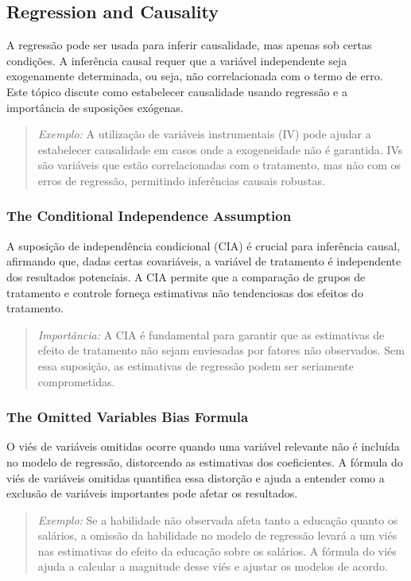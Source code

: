 \documentclass[a4paper,12pt]{article}[abntex2]
\begin{document}
\subsection{Regression and Causality}
A regressão pode ser usada para inferir causalidade, mas apenas sob certas condições. A inferência causal requer que a variável independente seja exogenamente determinada, ou seja, não correlacionada com o termo de erro. Este tópico discute como estabelecer causalidade usando regressão e a importância de suposições exógenas.

\begin{quote}
\textit{Exemplo:} A utilização de variáveis instrumentais (IV) pode ajudar a estabelecer causalidade em casos onde a exogeneidade não é garantida. IVs são variáveis que estão correlacionadas com o tratamento, mas não com os erros de regressão, permitindo inferências causais robustas.
\end{quote}

\subsubsection{The Conditional Independence Assumption}
A suposição de independência condicional (CIA) é crucial para inferência causal, afirmando que, dadas certas covariáveis, a variável de tratamento é independente dos resultados potenciais. A CIA permite que a comparação de grupos de tratamento e controle forneça estimativas não tendenciosas dos efeitos do tratamento.

\begin{quote}
\textit{Importância:} A CIA é fundamental para garantir que as estimativas de efeito de tratamento não sejam enviesadas por fatores não observados. Sem essa suposição, as estimativas de regressão podem ser seriamente comprometidas.
\end{quote}

\subsubsection{The Omitted Variables Bias Formula}
O viés de variáveis omitidas ocorre quando uma variável relevante não é incluída no modelo de regressão, distorcendo as estimativas dos coeficientes. A fórmula do viés de variáveis omitidas quantifica essa distorção e ajuda a entender como a exclusão de variáveis importantes pode afetar os resultados.

\begin{quote}
\textit{Exemplo:} Se a habilidade não observada afeta tanto a educação quanto os salários, a omissão da habilidade no modelo de regressão levará a um viés nas estimativas do efeito da educação sobre os salários. A fórmula do viés ajuda a calcular a magnitude desse viés e ajustar os modelos de acordo.
\end{quote}
\end{document}
